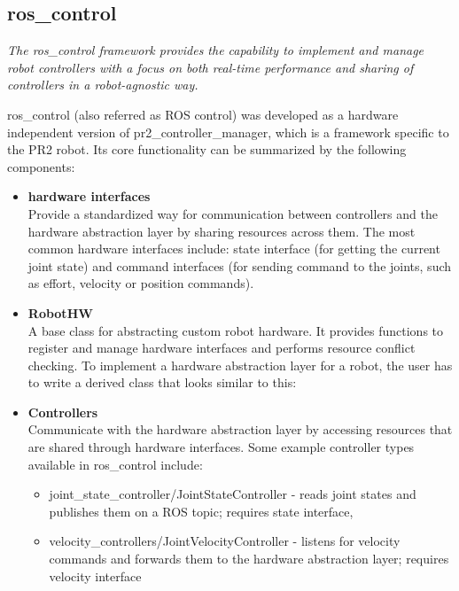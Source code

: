 \documentclass[english,inz,shortabstract]{iithesis}
\begin{document}
    \subsection{ros\_control}
    
    \textit{The ros\_control framework provides the capability to implement and manage robot controllers with a focus on both real-time performance and sharing of controllers in a robot-agnostic way.} 
    \cite{ros_control:paper}
    
    \textsf{ros\_control} (also referred as \textsf{ROS control}) was developed as a hardware independent version of \textsf{pr2\_controller\_manager}, which is a framework specific to the PR2 robot. Its core functionality can be summarized by the following components:

    \begin{itemize}
        \item \textbf{hardware interfaces}\\
        Provide a standardized way for communication between controllers and the hardware abstraction layer by sharing resources across them. The most common hardware interfaces include: state interface (for getting the current joint state) and command interfaces (for sending command to the joints, such as effort, velocity or position commands).   
        \item \textbf{RobotHW}\\
        A base class for abstracting custom robot hardware. It provides functions to register and manage hardware interfaces and performs resource conflict checking. To implement a hardware abstraction layer for a robot, the user has to write a derived class that looks similar to this:
        
        \item \textbf{Controllers}\\
        Communicate with the hardware abstraction layer by accessing resources that are shared through hardware interfaces. Some example controller types available in \textsf{ros\_control} include:
            \begin{itemize}
                \item \textsf{joint\_state\_controller/JointStateController} - reads joint states and publishes them on a ROS topic; requires state interface,
                \item \textsf{velocity\_controllers/JointVelocityController} - listens for velocity commands and forwards them to the hardware abstraction layer; requires velocity interface

\end{itemize}
\end{itemize}
\end{document}
